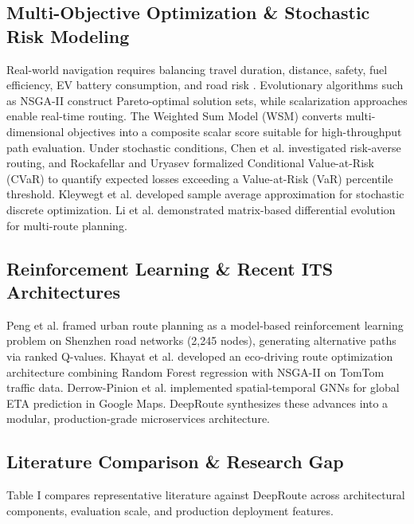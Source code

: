 \documentclass[journal]{IEEEtran}
\begin{document}
\subsection{Multi-Objective Optimization \& Stochastic Risk Modeling}
Real-world navigation requires balancing travel duration, distance, safety, fuel efficiency, EV battery consumption, and road risk \cite{ref29}. Evolutionary algorithms such as NSGA-II \cite{ref30} construct Pareto-optimal solution sets, while scalarization approaches \cite{ref31} enable real-time routing. The Weighted Sum Model (WSM) \cite{ref32} converts multi-dimensional objectives into a composite scalar score suitable for high-throughput path evaluation. Under stochastic conditions, Chen et al. \cite{ref33} investigated risk-averse routing, and Rockafellar and Uryasev \cite{ref34} formalized Conditional Value-at-Risk (CVaR) to quantify expected losses exceeding a Value-at-Risk (VaR) percentile threshold. Kleywegt et al. \cite{ref35} developed sample average approximation for stochastic discrete optimization. Li et al. \cite{ref11} demonstrated matrix-based differential evolution for multi-route planning.

\subsection{Reinforcement Learning \& Recent ITS Architectures}
Peng et al. \cite{ref12} framed urban route planning as a model-based reinforcement learning problem on Shenzhen road networks (2,245 nodes), generating alternative paths via ranked Q-values. Khayat et al. \cite{ref13} developed an eco-driving route optimization architecture combining Random Forest regression with NSGA-II on TomTom traffic data. Derrow-Pinion et al. \cite{ref14} implemented spatial-temporal GNNs for global ETA prediction in Google Maps. DeepRoute synthesizes these advances into a modular, production-grade microservices architecture.

\subsection{Literature Comparison \& Research Gap}
Table I compares representative literature against DeepRoute across architectural components, evaluation scale, and production deployment features.
\end{document}
